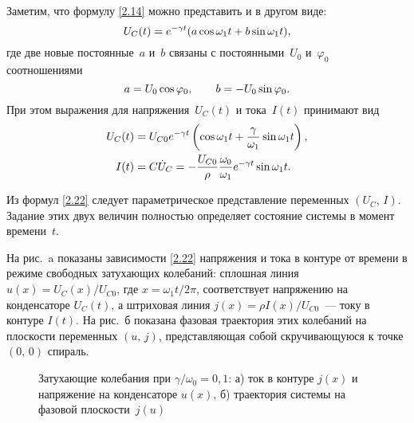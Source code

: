 Заметим, что формулу \eqref{2.14} можно представить и в другом виде:
\begin{equation*}\eqmark{2.20}
U_C(t)=e^{-\gamma t}(a\cos\omega_1 t+ b\sin\omega_1 t),
\end{equation*}
где две новые постоянные~$a$ и~$b$ связаны с постоянными~$U_0$ и~$\varphi_0$
соотношениями
\begin{equation*}\eqmark{2.21}
a=U_0 \cos\varphi_0, \qquad b=-U_0 \sin\varphi_0.
\end{equation*}
При этом выражения для напряжения~$U_C(t)$ и тока~$I(t)$
принимают вид
\begin{equation}
	\eqmark{2.22}
		\begin{aligned}
			U_C(t)&=U_{C0}e^{-\gamma t}
                \left(\cos\omega_1 t + \frac{\gamma}{\omega_1}\sin\omega_1 t \right), \\
			I(t) & =C\dot{U}_C
                =-\frac{U_{C0}}{\rho} 
                        \frac{\omega_0}{\omega_1}e^{-\gamma t}\sin\omega_1 t.
		\end{aligned}
\end{equation}

Из формул \eqref{2.22} следует параметрическое представление
 переменных 
$(U_C,\,I)$. Задание этих двух величин полностью определяет состояние
системы в момент времени~$t$.

На рис.~a показаны 
зависимости \eqref{2.22} напряжения и тока в контуре от времени в режиме
свободных затухающих колебаний: сплошная линия 
$u(x)=U_C(x)/U_{C0}$, где $x=\omega_1t/2\pi$, 
соответствует напряжению на конденсаторе $U_C(t)$, а
штриховая линия $j(x)=\rho I(x)/U_{C0}$~--- току в контуре $I(t)$. 
На рис.~б показана фазовая траектория этих колебаний на плоскости
переменных $(u,\,j)$, представляющая собой скручивающуюся 
к точке $(0,\,0)$ спираль.

\begin{figure}[h]
	\begin{minipage}[h]{0.5\linewidth}
		\centering\small
	\end{minipage}
	\hfill
	\begin{minipage}[h]{0.5\linewidth}
		\centering\small
	\end{minipage}
	\caption{Затухающие колебания при $\gamma/\omega_0=0,1$:
а) ток в контуре $j(x)$ и напряжение на конденсаторе $u(x)$,
б) траектория системы на фазовой плоскости~$j(u)$}
\end{figure}

